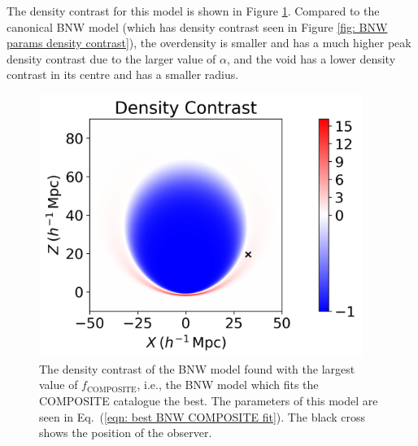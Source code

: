 \documentclass[a4paper,12pt]{report}
\renewcommand{\eqref}[1]{Eq.~({#1})}
\begin{document}
The density contrast for this model is shown in Figure \ref{fig: BNW model best COMPOSITE fit density contrast}. Compared to the canonical BNW model (which has density contrast seen in Figure \ref{fig: BNW params density contrast}), the overdensity is smaller and has a much higher peak density contrast due to the larger value of $\alpha$, and the void has a lower density contrast in its centre and has a smaller radius.

\begin{figure}[t]
    \centering
    \includegraphics[width=105mm]{BNW Model MCMC/best comp fit/best composite only fit density contrast.png}
    \caption{The density contrast of the BNW model found with the largest value of $f_\text{COMPOSITE}$, i.e., the BNW model which fits the COMPOSITE catalogue the best. The parameters of this model are seen in \eqref{\ref{eqn: best BNW COMPOSITE fit}}. The black cross shows the position of the observer.}
    \label{fig: BNW model best COMPOSITE fit density contrast}
\end{figure}
\end{document}
